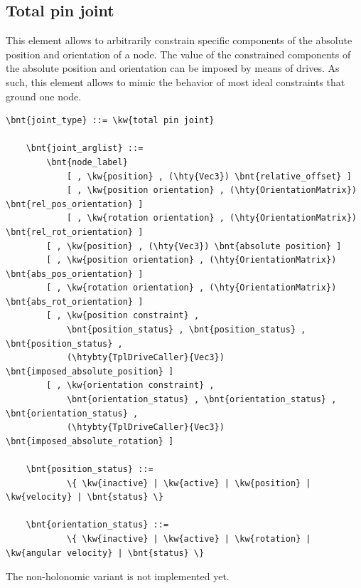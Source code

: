 \subsection{Total pin joint}
This element allows to arbitrarily constrain specific components
of the absolute position and orientation of a node.
The value of the constrained components of the absolute position
and orientation can be imposed by means of drives.
As such, this element allows to mimic the behavior of most
ideal constraints that ground one node.
\label{sec:EL:STRUCT:JOINT:TOTAL_PIN_JOINT}
\begin{Verbatim}[commandchars=\\\{\}]
    \bnt{joint_type} ::= \kw{total pin joint}

    \bnt{joint_arglist} ::=
        \bnt{node_label}
            [ , \kw{position} , (\hty{Vec3}) \bnt{relative_offset} ]
            [ , \kw{position orientation} , (\hty{OrientationMatrix}) \bnt{rel_pos_orientation} ]
            [ , \kw{rotation orientation} , (\hty{OrientationMatrix}) \bnt{rel_rot_orientation} ]
        [ , \kw{position} , (\hty{Vec3}) \bnt{absolute position} ]
        [ , \kw{position orientation} , (\hty{OrientationMatrix}) \bnt{abs_pos_orientation} ]
        [ , \kw{rotation orientation} , (\hty{OrientationMatrix}) \bnt{abs_rot_orientation} ]
        [ , \kw{position constraint} ,
            \bnt{position_status} , \bnt{position_status} , \bnt{position_status} ,
            (\htybty{TplDriveCaller}{Vec3}) \bnt{imposed_absolute_position} ]
        [ , \kw{orientation constraint} ,
            \bnt{orientation_status} , \bnt{orientation_status} , \bnt{orientation_status} ,
            (\htybty{TplDriveCaller}{Vec3}) \bnt{imposed_absolute_rotation} ]

    \bnt{position_status} ::=
            \{ \kw{inactive} | \kw{active} | \kw{position} | \kw{velocity} | \bnt{status} \}

    \bnt{orientation_status} ::=
            \{ \kw{inactive} | \kw{active} | \kw{rotation} | \kw{angular velocity} | \bnt{status} \}
\end{Verbatim}
The non-holonomic variant is not implemented yet.

